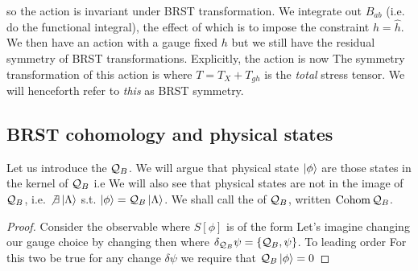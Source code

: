 \documentclass{article}
\begin{document}
so the action is invariant under BRST transformation. We integrate out $B_{ab}$ (i.e. do the functional integral), the effect of which is to impose the constraint $h =\hat{h}$. We then have an action with a gauge fixed $h$ but we still have the residual symmetry of BRST transformations. Explicitly, the action is now 
The symmetry transformation of this action is 
where $T=T_X + T_{gh}$ is the \emph{total} stress tensor. We will henceforth refer to \emph{this} as BRST symmetry. 

\subsection{BRST cohomology and physical states}
Let us introduce the  $\mc{Q}_B$. We will argue that physical state $\ket{\phi}$ are those states in the kernel of $\mc{Q}_B$ i.e 
We will also see that physical states are not in the image of $\mc{Q}_B$, i.e. $\not\exists \ket{\Lambda}$ s.t. $\ket{\phi} = \mc{Q}_B \ket{\Lambda}$. We shall call 
the  of $\mc{Q}_B$, written $\cohom \mc{Q}_B$. 

\begin{prop}
\end{prop}
\begin{proof}
Consider the observable 
where $S[\phi]$ is of the form 
Let's imagine changing our gauge choice by changing 
\eq{
\psi \to \psi + \delta \psi
}
then 
where $\delta_{\mc{Q}_B} \psi = \acomm[\mc{Q}_B]{\psi}$. To leading order 
For this two be true for any change $\delta \psi$ we require that $\mc{Q}_B\ket{\phi} = 0$
\end{proof}
\end{document}

